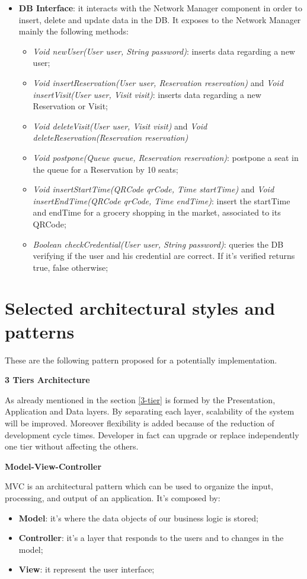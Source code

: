 \begin{itemize}
\item \textbf{DB Interface}: it interacts with the Network Manager component in order to insert, delete and update data in the DB. It exposes to the Network Manager mainly the following methods:
\begin{itemize}
\item \textit{Void newUser(User user, String password)}: inserts data regarding a new user;
\item \textit{Void insertReservation(User user, Reservation reservation)} and \textit{Void insertVisit(User user, Visit visit)}: inserts data regarding a new Reservation or Visit;
\item \textit{Void deleteVisit(User user, Visit visit)} and \textit{Void deleteReservation(Reservation reservation)}
\item \textit{Void postpone(Queue queue, Reservation reservation)}: postpone a seat in the queue for a Reservation by 10 seats;
\item \textit{Void insertStartTime(QRCode qrCode, Time startTime)} and  \textit{Void insertEndTime(QRCode qrCode, Time endTime)}: insert the startTime and endTime for a grocery shopping in the market, associated to its QRCode;
\item \textit{Boolean checkCredential(User user, String password)}: queries the DB verifying if the user and his credential are correct. If it's verified returns true, false otherwise;
\end{itemize}

\end{itemize}

\pagebreak
\section{Selected architectural styles and patterns}
These are the following pattern proposed for a potentially implementation.
\medskip

\textbf{3 Tiers Architecture} \par
As already mentioned in the section \ref{3-tier} is formed by the Presentation, Application and Data layers. By separating each layer, scalability of the system will be improved.
Moreover flexibility is added because of the reduction of development cycle times. Developer in fact can upgrade or replace independently one tier without affecting the others. 
\bigskip

\textbf{Model-View-Controller} \par
MVC is an architectural pattern which can be used to organize the input, processing, and output of an application. It's composed by:
\begin{itemize}
\item \textbf{Model}: it's where the data objects of our business logic is stored;
\item \textbf{Controller}: it's a layer that responds to the users and to changes in the model;
\item \textbf{View}: it represent the user interface;
\end{itemize}

